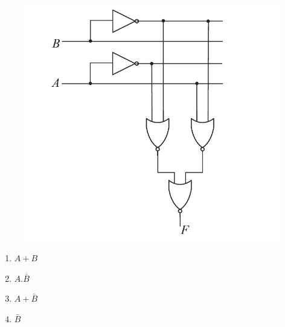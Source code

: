\documentclass{article}
\begin{document}
\begin{figure}[h]
\centering
\includegraphics[width=\columnwidth]{Gate figure.jpg}
\caption{}
\label{fig:my_label}
\end{figure}
\begin{enumerate}
	\item$A+B$
	\item$A.\bar{B}$
	\item$A+\bar{B}$
	\item$\bar{B}$
\end{enumerate}
\end{document}
